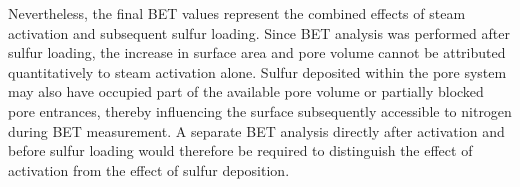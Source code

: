 Nevertheless, the final BET values represent the combined effects of steam activation and subsequent sulfur loading. Since BET analysis was performed after sulfur loading, the increase in surface area and pore volume cannot be attributed quantitatively to steam activation alone. Sulfur deposited within the pore system may also have occupied part of the available pore volume or partially blocked pore entrances, thereby influencing the surface subsequently accessible to nitrogen during BET measurement. A separate BET analysis directly after activation and before sulfur loading would therefore be required to distinguish the effect of activation from the effect of sulfur deposition.